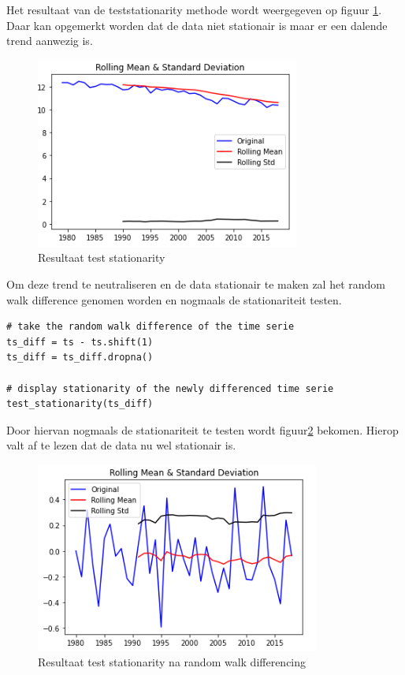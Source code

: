 Het resultaat van de test\textunderscore stationarity methode wordt weergegeven op figuur \ref{fig:stationarityunivariatenonseasonal}. Daar kan opgemerkt worden dat de data niet stationair is maar er een dalende trend aanwezig is.

\begin{figure}
    \centering
    \caption{Resultaat test stationarity}
    \label{fig:stationarityunivariatenonseasonal}
    \includegraphics[width=0.7\linewidth]{stationarity_univariate_non_seasonal}
\end{figure}

Om deze trend te neutraliseren en de data stationair te maken zal het random walk difference genomen worden en nogmaals de stationariteit testen.

\begin{verbatim}
# take the random walk difference of the time serie
ts_diff = ts - ts.shift(1)
ts_diff = ts_diff.dropna()

# display stationarity of the newly differenced time serie
test_stationarity(ts_diff)
\end{verbatim}

Door hiervan nogmaals de stationariteit te testen wordt figuur\ref{fig:stationarityunivariatenonseasonal2} bekomen. Hierop valt af te lezen dat de data nu wel stationair is.

\begin{figure}
    \centering
    \caption{Resultaat test stationarity na random walk differencing}
    \label{fig:stationarityunivariatenonseasonal2}
    \includegraphics[width=0.7\linewidth]{stationarity_univariate_non_seasonal2}
\end{figure}

